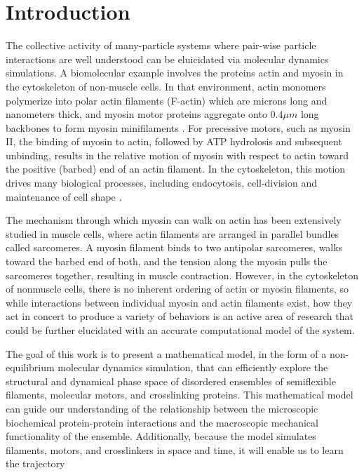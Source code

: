 \documentclass[12pt]{article}
\begin{document}
\section{Introduction} 
The collective activity of many-particle systems where pair-wise particle interactions are well understood 
can be eluicidated via molecular dynamics simulations. 
A biomolecular example involves the proteins actin and myosin in the cytoskeleton of non-muscle cells. In that
environment, actin monomers polymerize into polar actin filaments (F-actin) which are microns long and
nanometers thick, and myosin motor proteins aggregate onto $0.4\mu m$ long backbones to form myosin minifilaments \cite{niederman1975}. 
For precessive motors, such as myosin II, the binding of myosin to actin, followed by ATP hydrolosis and subsequent
unbinding, results in the relative motion of myosin with
respect to actin toward the positive (barbed) end of an actin filament. In the cytoskeleton, this
motion drives many biological processes, including endocytosis, cell-division and maintenance of cell shape
\cite{stricker2010, murrell2012}.
\par
The mechanism through which myosin can walk on actin has been extensively studied in muscle cells, where actin
filaments are arranged in parallel bundles called sarcomeres. A myosin filament binds to two antipolar
sarcomeres, walks toward the barbed end of both, and the tension along the myosin pulls the 
sarcomeres together, resulting in muscle contraction\cite{huxley1969}. 
However, in the cytoskeleton of nonmuscle cells, there is no inherent ordering of actin or myosin filaments, so while
interactions between individual myosin and actin filaments exist, how 
they act in concert to produce a variety of behaviors is an active area of research 
that could be further elucidated with an accurate computational model of the 
system\cite{murrell2012, stam2015, murrell2015}. 
\par
The goal of this work is to present a mathematical model, in the form of a non-equilibrium molecular dynamics
simulation, that can efficiently explore the structural and dynamical phase space of 
disordered ensembles of semiflexible filaments, molecular motors, and crosslinking proteins.
This mathematical model can guide our understanding of the relationship between
the microscopic biochemical protein-protein interactions and the macroscopic mechanical functionality of the ensemble. Additionally,
because the model simulates filaments, motors, and crosslinkers in space and time, it will enable us to learn the trajectory
\end{document}
